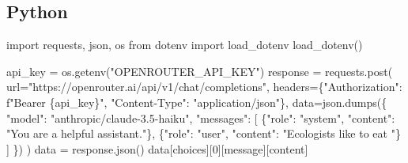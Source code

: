 \documentclass[
  letterpaper,
  DIV=11,
  numbers=noendperiod]{scrreprt}
\newenvironment{Shaded}{\begin{snugshade}}{\end{snugshade}}
\newcommand{\AttributeTok}[1]{\textcolor[rgb]{0.40,0.45,0.13}{#1}}
\newcommand{\DecValTok}[1]{\textcolor[rgb]{0.68,0.00,0.00}{#1}}
\newcommand{\FunctionTok}[1]{\textcolor[rgb]{0.28,0.35,0.67}{#1}}
\newcommand{\ImportTok}[1]{\textcolor[rgb]{0.00,0.46,0.62}{#1}}
\newcommand{\NormalTok}[1]{\textcolor[rgb]{0.00,0.23,0.31}{#1}}
\newcommand{\OperatorTok}[1]{\textcolor[rgb]{0.37,0.37,0.37}{#1}}
\newcommand{\OtherTok}[1]{\textcolor[rgb]{0.00,0.23,0.31}{#1}}
\newcommand{\SpecialCharTok}[1]{\textcolor[rgb]{0.37,0.37,0.37}{#1}}
\newcommand{\SpecialStringTok}[1]{\textcolor[rgb]{0.13,0.47,0.30}{#1}}
\newcommand{\StringTok}[1]{\textcolor[rgb]{0.13,0.47,0.30}{#1}}
\begin{document}
\begin{Shaded}
\end{Shaded}

\subsection{Python}

\begin{Shaded}
\begin{Highlighting}[]
\ImportTok{import}\NormalTok{ requests, json, os}
\ImportTok{from}\NormalTok{ dotenv }\ImportTok{import}\NormalTok{ load\_dotenv}
\NormalTok{load\_dotenv()}

\NormalTok{api\_key }\OperatorTok{=}\NormalTok{ os.getenv(}\StringTok{"OPENROUTER\_API\_KEY"}\NormalTok{)}
\NormalTok{response }\OperatorTok{=}\NormalTok{ requests.post(}
\NormalTok{  url}\OperatorTok{=}\StringTok{"https://openrouter.ai/api/v1/chat/completions"}\NormalTok{,}
\NormalTok{  headers}\OperatorTok{=}\NormalTok{\{}\StringTok{"Authorization"}\NormalTok{: }\SpecialStringTok{f"Bearer }\SpecialCharTok{\{}\NormalTok{api\_key}\SpecialCharTok{\}}\SpecialStringTok{"}\NormalTok{, }\StringTok{"Content{-}Type"}\NormalTok{: }\StringTok{"application/json"}\NormalTok{\},}
\NormalTok{  data}\OperatorTok{=}\NormalTok{json.dumps(\{}
    \StringTok{"model"}\NormalTok{: }\StringTok{"anthropic/claude{-}3.5{-}haiku"}\NormalTok{,}
    \StringTok{"messages"}\NormalTok{: [}
\NormalTok{      \{}\StringTok{"role"}\NormalTok{: }\StringTok{"system"}\NormalTok{, }\StringTok{"content"}\NormalTok{: }\StringTok{"You are a helpful assistant."}\NormalTok{\},}
\NormalTok{      \{}\StringTok{"role"}\NormalTok{: }\StringTok{"user"}\NormalTok{, }\StringTok{"content"}\NormalTok{: }\StringTok{"Ecologists like to eat "}\NormalTok{\}}
\NormalTok{    ]}
\NormalTok{  \})}
\NormalTok{)}
\NormalTok{data }\OperatorTok{=}\NormalTok{ response.json()}
\NormalTok{data[}\StringTok{\textquotesingle{}choices\textquotesingle{}}\NormalTok{][}\DecValTok{0}\NormalTok{][}\StringTok{\textquotesingle{}message\textquotesingle{}}\NormalTok{][}\StringTok{\textquotesingle{}content\textquotesingle{}}\NormalTok{]}
\end{Highlighting}
\end{Shaded}
\end{document}
